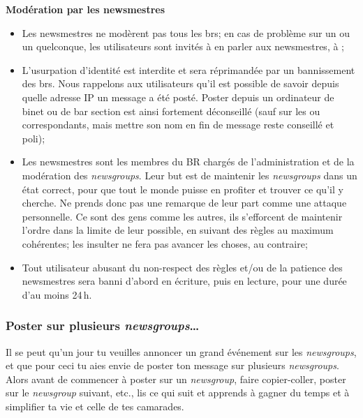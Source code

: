 \textbf{Modération par les newsmestres}
\begin{itemize}
 \item Les newsmestres ne modèrent pas tous les brs; en cas de problème sur un  ou un  quelconque, les utilisateurs sont invités à en parler aux newsmestres, à ;
 \item L'usurpation d'identité est interdite et sera réprimandée par un bannissement des brs. Nous rappelons aux utilisateurs qu'il est possible de savoir depuis quelle adresse IP un message a été posté. Poster depuis un ordinateur de binet ou de bar section est ainsi fortement déconseillé (sauf sur les  ou  correspondants, mais mettre son nom en fin de message reste conseillé et poli);
 \item Les newsmestres sont les membres du BR chargés de l'administration et de la modération des \emph{newsgroups}. Leur but est de maintenir les \emph{newsgroups} dans un état correct, pour que tout le monde puisse en profiter et trouver ce qu'il y cherche. Ne prends donc pas une remarque de leur part comme une attaque personnelle. Ce sont des gens comme les autres, ils s'efforcent de maintenir l'ordre dans la limite de leur possible, en suivant des règles au maximum cohérentes; les insulter ne fera pas avancer les choses, au contraire;
 \item Tout utilisateur abusant du non-respect des règles et/ou de la patience des newsmestres sera banni d'abord en écriture, puis en lecture, pour une durée d'au moins 24\,h.
\end{itemize}


\subsubsection{Poster sur plusieurs \emph{newsgroups}\dots }



Il se peut qu'un jour tu veuilles annoncer un grand événement sur les \emph{newsgroups}, et que pour ceci tu aies envie de poster ton message sur
plusieurs \emph{newsgroups}. Alors avant de commencer à poster sur un \emph{newsgroup}, faire copier-coller, poster sur le \emph{newsgroup} suivant,
etc., lis ce qui suit et apprends à gagner du temps et à simplifier ta vie et celle de tes camarades.

